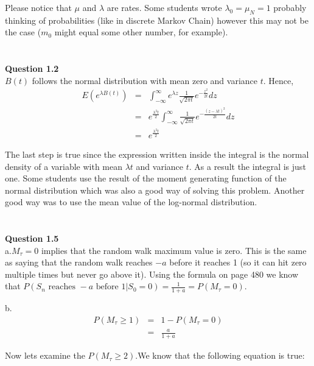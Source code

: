 \documentclass[10pt,a4paper]{article}
\begin{document}
\begin{flushleft}
Please notice that $\mu$ and $\lambda$ are rates. Some students
wrote $\lambda_0=\mu_N=1$ probably thinking of probabilities (like
in discrete Markov Chain) however this may not be the case ($m_0$
might equal some other number, for example).

\begin{eqnarray*}
\\
\end{eqnarray*}


\textbf{Question 1.2}\\

$B(t)$ follows the normal distribution with mean zero and variance
$t$. Hence,
\begin{eqnarray*}
E(e^{\lambda B(t)})&=& \int_{-\infty}^{\infty} e^{\lambda z}
\frac{1}{\sqrt{2 \pi t}} e^{-\frac{z^2}{2t}} dz\\
&=& e^{\frac{\lambda^2 t}{2}} \int_{-\infty}^{\infty}
\frac{1}{\sqrt{2 \pi t}} e^{-\frac{(z-\lambda t)^2}{2t}} dz\\
&=& e^{\frac{\lambda^2 t}{2}}
\end{eqnarray*}

The last step is true since the expression written inside the
integral is the normal density of a variable with mean $\lambda t$
and variance $t$. As a result the integral is just one. Some
students use the result of the moment generating function of the
normal distribution which was also a good way of solving this
problem. Another good way was to use the mean value of the
log-normal distribution.


\begin{eqnarray*}
\\
\end{eqnarray*}


\textbf{Question 1.5}\\

a.$M_\tau=0$ implies that the random walk maximum value is zero.
This is the same as saying that the random walk reaches $-a$
before it reaches 1 (so it can hit zero multiple times but never
go above it). Using the formula on page 480 we know that $P(S_n
\textrm{ reaches } -a  \textrm{ before } 1
|S_0=0)=\frac{1}{1+a}=P(M_\tau=0)$.

b. \begin{eqnarray*}
P(M_\tau \geq 1)&=&1-P(M_\tau=0)\\
&=& \frac{a}{1+a}
\end{eqnarray*}

Now lets examine the $P(M_\tau \geq 2)$.We know that the following
equation is true:


\end{flushleft}
\end{document}

